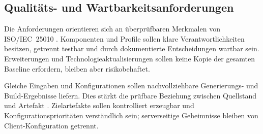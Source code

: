 \subsection{Qualitäts- und Wartbarkeitsanforderungen}
\label{subsec:qualitaets-wartbarkeitsanforderungen}

Die Anforderungen orientieren sich an überprüfbaren Merkmalen von
ISO/IEC~25010 \parencite{iso25010-2023}. Komponenten und Profile sollen klare
Verantwortlichkeiten besitzen, getrennt testbar und durch dokumentierte
Entscheidungen wartbar sein. Erweiterungen und Technologieaktualisierungen
sollen keine Kopie der gesamten Baseline erfordern, bleiben aber risikobehaftet.

Gleiche Eingaben und Konfigurationen sollen nachvollziehbare Generierungs- und
Build-Ergebnisse liefern. Dies stärkt die prüfbare Beziehung zwischen
Quellstand und Artefakt \parencite{lamb2022reproducible-builds}. Zielartefakte
sollen kontrolliert erzeugbar und Konfigurationsprioritäten verständlich sein;
serverseitige Geheimnisse bleiben von Client-Konfiguration getrennt.
